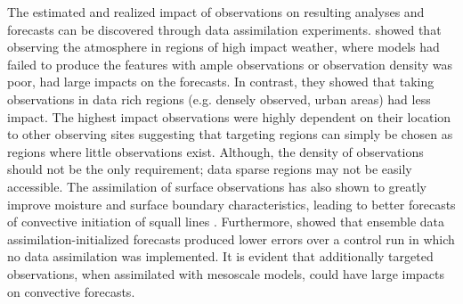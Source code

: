 \documentclass{ttuthes2007}
\newcommand{\tab}{\hspace*{2em}}  %
\begin{document}
\tab The estimated and realized impact of observations on resulting analyses and forecasts can be discovered through data assimilation experiments. \cite{TyndallandHorel2013} showed that observing the atmosphere in regions of high impact weather, where models had failed to produce the features with ample observations or observation density was poor, had large impacts on the forecasts. In contrast, they showed that taking observations in data rich regions (e.g. densely observed, urban areas) had less impact. The highest impact observations were highly dependent on their location to other observing sites suggesting that targeting regions can simply be chosen as regions where little observations exist. Although, the density of observations should not be the only requirement; data sparse regions may not be easily accessible. The assimilation of surface observations has also shown to greatly improve moisture and surface boundary characteristics, leading to better forecasts of convective initiation of squall lines \citep{HaandSnyder2014}. Furthermore, \cite{Wheatleyetal2012} showed that ensemble data assimilation-initialized forecasts produced lower errors over a control run in which no data assimilation was implemented. It is evident that additionally targeted observations, when assimilated with mesoscale models, could have large impacts on convective forecasts. \\
\end{document}

